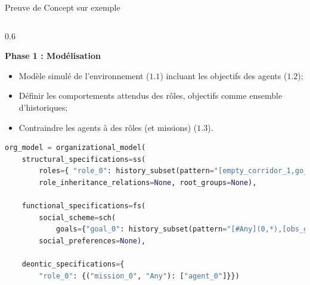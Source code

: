 \begin{frame}[fragile]{Preuve de Concept sur exemple}{}

    \begin{columns}

        \begin{column}{0.6\textwidth}
    
            \textbf{Phase 1 : Modélisation}
    
            \begin{itemize}
                \item Modèle simulé de l'environnement ($1.1$) incluant les objectifs des agents ($1.2$);
                \item Définir les comportements attendus des rôles, objectifs comme ensemble d'historiques;
                \item Contraindre les agents à des rôles (et missions) ($1.3$).
            \end{itemize}

            \begin{lstlisting}[language=Python,basicstyle=\scriptsize]
org_model = organizational_model(
    structural_specifications=ss(
        roles={ "role_0": history_subset(pattern="[empty_corridor_1,go_up](1,7),[empty_corridor_3,go_down](1,8)")},
        role_inheritance_relations=None, root_groups=None),
    
    functional_specifications=fs(
        social_scheme=sch(
            goals={"goal_0": history_subset(pattern="[#Any](0,*),[obs_goal_0]")},missions=["mission_0"], goals_structure=None,mission_to_goals={"mission_0": ["goal_0"]},mission_to_agent_cardinality=None),
        social_preferences=None),

    deontic_specifications={
        "role_0": {("mission_0", "Any"): ["agent_0"]}})\end{lstlisting}

        \end{column}
    

\end{columns}
\end{frame}
